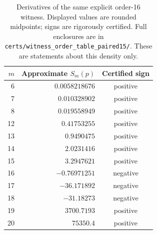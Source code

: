 \begin{table}[htbp]
\centering
\begin{tabular}{rrc}
\toprule
$m$ & Approximate $S_m(p)$ & Certified sign \\
\midrule
6 & $0.0058218676$ & positive \\
7 & $0.010328902$ & positive \\
8 & $0.019558949$ & positive \\
12 & $0.41753255$ & positive \\
13 & $0.9490475$ & positive \\
14 & $2.0231416$ & positive \\
15 & $3.2947621$ & positive \\
16 & $-0.76971251$ & negative \\
17 & $-36.171892$ & negative \\
18 & $-31.18273$ & negative \\
19 & $3700.7193$ & positive \\
20 & $75350.4$ & positive \\
\bottomrule
\end{tabular}
\caption{Derivatives of the same explicit order-16 witness. Displayed values are rounded midpoints; signs are rigorously certified. Full enclosures are in \texttt{certs/witness\_order\_table\_paired15/}. These are statements about this density only.}
\end{table}
